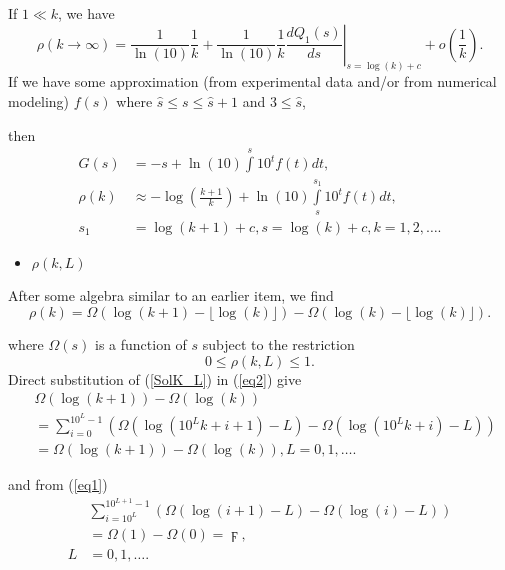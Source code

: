 \documentclass[titlepage,fleqn]{article}%
\begin{document}
If $1\ll k$, we have%
\begin{equation}
\rho(k\rightarrow\infty)=\frac{1}{\ln(10)}\frac{1}{k}+\frac{1}{\ln(10)}%
\frac{1}{k}\left.  \frac{dQ_{1}(s)}{ds}\right\vert _{s=\log(k)+c}+o\left(
\frac{1}{k}\right)  . \label{AsymptK}%
\end{equation}
If we have some approximation (from experimental data and/or from numerical
modeling) $f(s)$ where $\hat{s}\leq s\leq\hat{s}+1$ and $3\leq\hat{s}$,

\noindent then%
\begin{align*}
G(s)  &  =-s+\ln(10)%
{\displaystyle\int\limits^{s}}
10^{t}f(t)dt,\\
\rho(k)  &  \approx-\log\left(  \frac{k+1}{k}\right)  +\ln(10)%
{\displaystyle\int\limits_{s}^{s_{1}}}
10^{t}f(t)dt,\\
s_{1}  &  =\log\left(  k+1\right)  +c,s=\log\left(  k\right)  +c,k=1,2,\ldots.
\end{align*}


\begin{itemize}
\item $\rho(k,L)$
\end{itemize}

After some algebra similar to an earlier item, we find%
\begin{equation}
\rho(k)=\Omega(\log(k+1)-\lfloor\log(k)\rfloor)-\Omega(\log(k)-\lfloor
\log(k)\rfloor). \label{SolK_L}%
\end{equation}


\noindent where $\Omega(s)$ is a function of $s$ subject to the restriction%
\[
0\leq\rho(k,L)\leq1.
\]
Direct substitution of (\ref{SolK_L}) in (\ref{eq2}) give%
\begin{align}
&  \Omega(\log(k+1))-\Omega(\log(k))\label{identical2}\\
&  =%
{\displaystyle\sum\limits_{i=0}^{10^{L}-1}}
\left(  \Omega(\log(10^{L}k+i+1)-L)-\Omega(\log(10^{L}k+i)-L)\right)
\nonumber\\
&  =\Omega(\log(k+1))-\Omega(\log(k)),L=0,1,\ldots.\nonumber
\end{align}


\noindent and from (\ref{eq1})%
\begin{align}
&
{\displaystyle\sum\limits_{i=10^{L}}^{10^{L+1}-1}}
\left(  \Omega(\log(i+1)-L)-\Omega(\log(i)-L)\right) \label{identical1}\\
&  =\Omega(1)-\Omega(0)=\digamma,\nonumber\\
L  &  =0,1,\ldots.\nonumber
\end{align}
\end{document}
